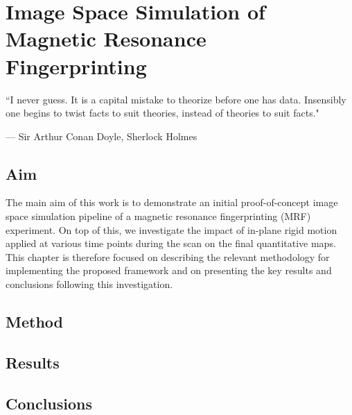 \chapter{Image Space Simulation of Magnetic Resonance Fingerprinting}
\label{chapterlabel3}
\epigraph{``I never guess. It is a capital mistake to theorize before one has data. Insensibly one begins to twist facts to suit theories, instead of theories to suit facts."}{--- \textup{Sir Arthur Conan Doyle}, Sherlock Holmes}

\section{Aim}\label{chapterlabel3sec1}
The main aim of this work is to demonstrate an initial proof-of-concept image space simulation pipeline of a magnetic resonance fingerprinting (MRF) experiment.
On top of this, we investigate the impact of in-plane rigid motion applied at various time points during the scan on the final quantitative maps.
This chapter is therefore focused on describing the relevant methodology for implementing the proposed framework and on presenting the key results and conclusions following this investigation.

\section{Method}\label{chapterlabel3sec2}


\section{Results}\label{chapterlabel3sec3}


\section{Conclusions}\label{chapterlabel3sec4}

